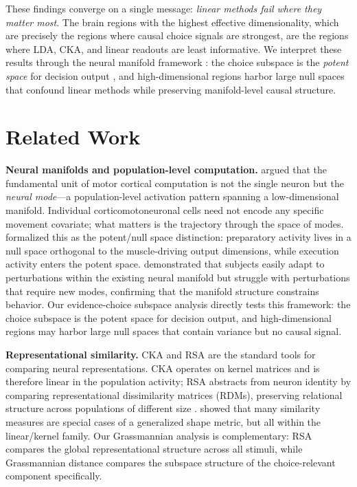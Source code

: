 \documentclass{article}
\begin{document}
These findings converge on a single message: \emph{linear methods fail where they matter most}. The brain regions with the highest effective dimensionality, which are precisely the regions where causal choice signals are strongest, are the regions where LDA, CKA, and linear readouts are least informative. We interpret these results through the neural manifold framework \citep{gallego2017neural}: the choice subspace is the \emph{potent space} for decision output \citep{kaufman2014cortical}, and high-dimensional regions harbor large null spaces that confound linear methods while preserving manifold-level causal structure.

\section{Related Work}

\textbf{Neural manifolds and population-level computation.} \citet{gallego2017neural} argued that the fundamental unit of motor cortical computation is not the single neuron but the \emph{neural mode}---a population-level activation pattern spanning a low-dimensional manifold. Individual corticomotoneuronal cells need not encode any specific movement covariate; what matters is the trajectory through the space of modes. \citet{kaufman2014cortical} formalized this as the potent/null space distinction: preparatory activity lives in a null space orthogonal to the muscle-driving output dimensions, while execution activity enters the potent space. \citet{sadtler2014neural} demonstrated that subjects easily adapt to perturbations within the existing neural manifold but struggle with perturbations that require new modes, confirming that the manifold structure constrains behavior. Our evidence-choice subspace analysis directly tests this framework: the choice subspace is the potent space for decision output, and high-dimensional regions may harbor large null spaces that contain variance but no causal signal.

\textbf{Representational similarity.} CKA \citep{kornblith2019similarity} and RSA \citep{kriegeskorte2008representational} are the standard tools for comparing neural representations. CKA operates on kernel matrices and is therefore linear in the population activity; RSA abstracts from neuron identity by comparing representational dissimilarity matrices (RDMs), preserving relational structure across populations of different size \citep{kriegeskorte2008representational}. \citet{williams2021generalized} showed that many similarity measures are special cases of a generalized shape metric, but all within the linear/kernel family. Our Grassmannian analysis is complementary: RSA compares the global representational structure across all stimuli, while Grassmannian distance compares the subspace structure of the choice-relevant component specifically.
\end{document}
